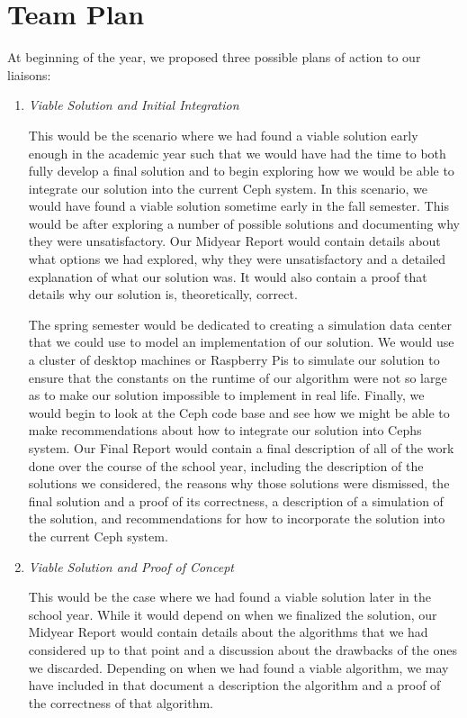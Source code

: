 \chapter{Team Plan}
\label{sec:plan}

At beginning of the year, we proposed three possible plans of action
to our liaisons:

\begin{enumerate}

\item \emph{Viable Solution and Initial Integration}

  This would be the scenario where we had found a viable solution
  early enough in the academic year such that we would have had the
  time to both fully develop a final solution and to begin exploring
  how we would be able to integrate our solution into the current Ceph
  system. In this scenario, we would have found a viable solution
  sometime early in the fall semester. This would be after exploring a
  number of possible solutions and documenting why they were
  unsatisfactory. Our Midyear Report would contain details about what
  options we had explored, why they were unsatisfactory and a detailed
  explanation of what our solution was. It would also contain a proof
  that details why our solution is, theoretically, correct.

  The spring semester would be dedicated to creating a simulation data
  center that we could use to model an implementation of our
  solution. We would use a cluster of desktop machines or Raspberry
  Pis to simulate our solution to ensure that the constants on the
  runtime of our algorithm were not so large as to make our solution
  impossible to implement in real life. Finally, we would begin to
  look at the Ceph code base and see how we might be able to make
  recommendations about how to integrate our solution into Cephs
  system. Our Final Report would contain a final description of all of
  the work done over the course of the school year, including the
  description of the solutions we considered, the reasons why those
  solutions were dismissed, the final solution and a proof of its
  correctness, a description of a simulation of the solution, and
  recommendations for how to incorporate the solution into the current
  Ceph system.


\item \emph{Viable Solution and Proof of Concept}

  This would be the case where we had found a viable solution later in
  the school year. While it would depend on when we finalized the
  solution, our Midyear Report would contain details about the
  algorithms that we had considered up to that point and a discussion
  about the drawbacks of the ones we discarded. Depending on when we
  had found a viable algorithm, we may have included in that document
  a description the algorithm and a proof of the correctness of that
  algorithm.


\end{enumerate}
